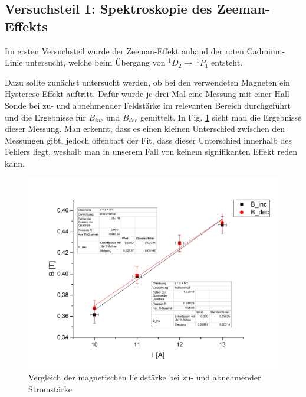 \subsection{Versuchsteil 1: Spektroskopie des Zeeman-Effekts}
Im ersten Versuchsteil wurde der Zeeman-Effekt anhand der roten Cadmium-Linie untersucht, welche beim Übergang von $^1D_2 \rightarrow ~^1P_1$ entsteht.

Dazu sollte zunächst untersucht werden, ob bei den verwendeten Magneten ein Hysterese-Effekt auftritt. Dafür wurde je drei Mal eine Messung mit einer Hall-Sonde bei zu- und abnehmender Feldstärke im relevanten Bereich durchgeführt und die Ergebnisse für $B_{inc}$ und $B_{dec}$ gemittelt. In Fig. \ref{fig:Hysterese} sieht man die Ergebnisse dieser Messung. Man erkennt, dass es einen kleinen Unterschied zwischen den Messungen gibt, jedoch offenbart der Fit, dass dieser Unterschied innerhalb des Fehlers liegt, weshalb man in unserem Fall von keinem signifikanten Effekt reden kann.
\begin{figure}
  \includegraphics[width=\linewidth]{images/Hysterese.png}
  \caption{Vergleich der magnetischen Feldstärke bei zu- und abnehmender Stromstärke}
  \label{fig:Hysterese}
\end{figure}

